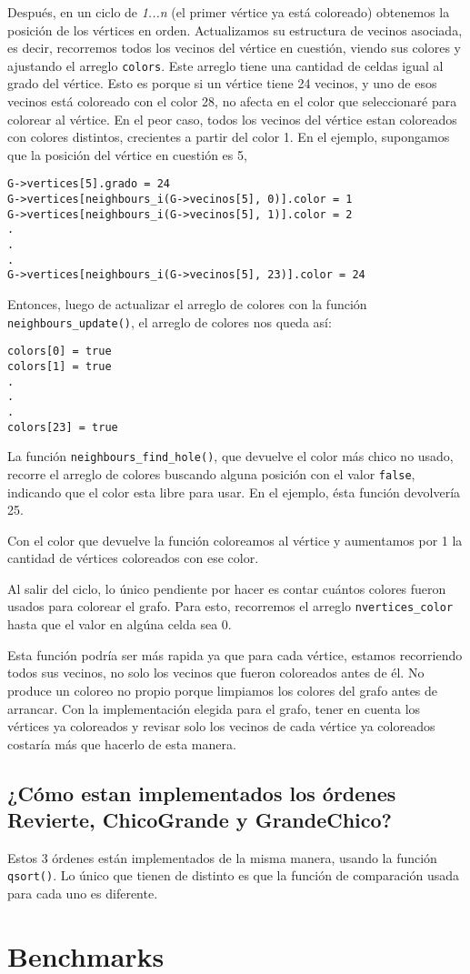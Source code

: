 \documentclass[11pt]{article}   	%
\begin{document}
Después, en un ciclo de \emph{1...n} (el primer vértice ya está coloreado) obtenemos la posición de los
vértices en orden. Actualizamos su estructura de vecinos asociada, es decir, recorremos todos los vecinos
del vértice en cuestión, viendo sus colores y ajustando el arreglo \texttt{colors}. Este arreglo tiene
una cantidad de celdas igual al grado del vértice. Esto es porque si un vértice tiene 24 vecinos, y uno de
esos vecinos está coloreado con el color 28, no afecta en el color que seleccionaré para colorear al vértice.
En el peor caso, todos los vecinos del vértice estan coloreados con colores distintos, crecientes a partir
del color 1. En el ejemplo, supongamos que la posición del vértice en cuestión es 5,
\lstset{style=customC}
\begin{lstlisting}
G->vertices[5].grado = 24
G->vertices[neighbours_i(G->vecinos[5], 0)].color = 1
G->vertices[neighbours_i(G->vecinos[5], 1)].color = 2
.
.
.
G->vertices[neighbours_i(G->vecinos[5], 23)].color = 24
\end{lstlisting}
Entonces, luego de actualizar el arreglo de colores con la función \texttt{neighbours\_update()}, el arreglo
de colores nos queda así:
\begin{lstlisting}
colors[0] = true
colors[1] = true
.
.
.
colors[23] = true
\end{lstlisting}
La función \texttt{neighbours\_find\_hole()}, que devuelve el color más chico no usado, recorre el arreglo
de colores buscando alguna posición con el valor \texttt{false}, indicando que el color esta libre para
usar. En el ejemplo, ésta función devolvería 25. 

Con el color que devuelve la función coloreamos al vértice y aumentamos por 1 la cantidad de vértices
coloreados con ese color.

Al salir del ciclo, lo único pendiente por hacer es contar cuántos colores fueron usados para colorear
el grafo. Para esto, recorremos el arreglo \texttt{nvertices\_color} hasta que el valor en algúna celda
sea 0.

Esta función podría ser más rapida ya que para cada vértice, estamos recorriendo todos sus vecinos, no solo
los vecinos que fueron coloreados antes de él. No produce un coloreo no propio porque limpiamos los colores
del grafo antes de arrancar. Con la implementación elegida para el grafo, tener en cuenta los vértices ya
coloreados y revisar solo los vecinos de cada vértice ya coloreados costaría más que hacerlo de esta manera.
\subsection{¿Cómo estan implementados los órdenes Revierte, ChicoGrande y GrandeChico?}
Estos 3 órdenes están implementados de la misma manera, usando la función \texttt{qsort()}. Lo único que
tienen de distinto es que la función de comparación usada para cada uno es diferente.
\clearpage

\section{Benchmarks}
\clearpage
\end{document}
